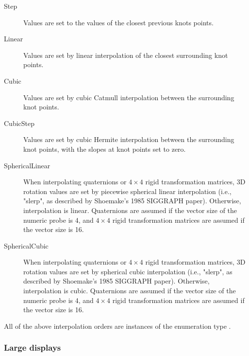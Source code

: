 \documentclass{article}
\begin{document}
\begin{description}

\item[Step]\mbox{}

Values are set to the values of the closest previous knots
points.

\item[Linear]\mbox{}

Values are set by linear interpolation of the closest surrounding knot
points.

\item[Cubic]\mbox{}

Values are set by cubic Catmull interpolation between the surrounding
knot points.

\item[CubicStep]\mbox{}

Values are set by cubic Hermite interpolation between the surrounding
knot points, with the slopes at knot points set to zero.

\item[SphericalLinear]\mbox{}

When interpolating quaternions or $4 \times 4$ rigid transformation
matrices, 3D rotation values are set by piecewise spherical linear
interpolation (i.e., "slerp", as described by Shoemake's 1985 SIGGRAPH
paper).  Otherwise, interpolation is linear. Quaternions are assumed
if the vector size of the numeric probe is 4, and $4 \times 4$ rigid
transformation matrices are assumed if the vector size is 16.

\item[SphericalCubic]\mbox{}

When interpolating quaternions or $4 \times 4$ rigid transformation
matrices, 3D rotation values are set by spherical cubic interpolation
(i.e., "slerp", as described by Shoemake's 1985 SIGGRAPH paper).
Otherwise, interpolation is cubic. Quaternions are assumed if the
vector size of the numeric probe is 4, and $4 \times 4$ rigid
transformation matrices are assumed if the vector size is 16.

\end{description}

All of the above interpolation orders are instances of the enumeration
type .

\subsubsection{Large displays}
\end{document}
